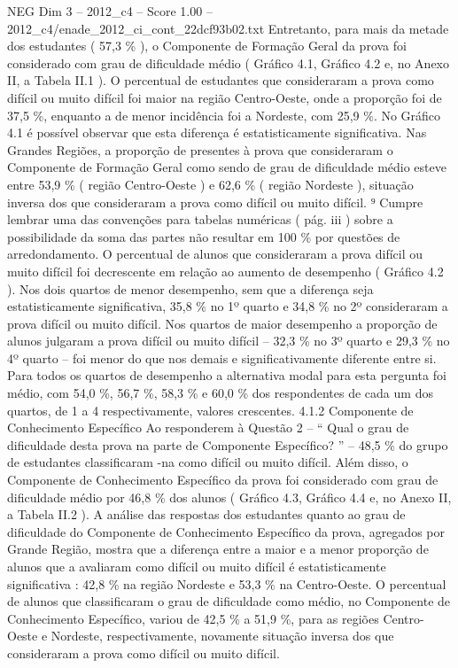 \begin{textsample}{NEG Dim 3 – 2012\_c4 – Score 1.00 – 2012\_c4/enade\_2012\_ci\_cont\_22dcf93b02.txt}
Entretanto, para mais da metade dos estudantes ( 57,3 \% ), o Componente de Formação Geral da prova foi considerado com grau de dificuldade médio ( Gráfico 4.1, Gráfico 4.2 e, no Anexo II, a Tabela II.1 ).
O percentual de estudantes que consideraram a prova como difícil ou muito difícil foi maior na região Centro-Oeste, onde a proporção foi de 37,5 \%, enquanto a de menor incidência foi a Nordeste, com 25,9 \%.
No Gráfico 4.1 é possível observar que esta diferença é estatisticamente significativa.
Nas Grandes Regiões, a proporção de presentes à prova que consideraram o Componente de Formação Geral como sendo de grau de dificuldade médio esteve entre 53,9 \% ( região Centro-Oeste ) e 62,6 \% ( região Nordeste ), situação inversa dos que consideraram a prova como difícil ou muito difícil. ⁹ Cumpre lembrar uma das convenções para tabelas numéricas ( pág. iii ) sobre a possibilidade da soma das partes não resultar em 100 \% por questões de arredondamento.
O percentual de alunos que consideraram a prova difícil ou muito difícil foi decrescente em relação ao aumento de desempenho ( Gráfico 4.2 ).
Nos dois quartos de menor desempenho, sem que a diferença seja estatisticamente significativa, 35,8 \% no 1º quarto e 34,8 \% no 2º consideraram a prova difícil ou muito difícil.
Nos quartos de maior desempenho a proporção de alunos julgaram a prova difícil ou muito difícil – 32,3 \% no 3º quarto e 29,3 \% no 4º quarto – foi menor do que nos demais e significativamente diferente entre si.
Para todos os quartos de desempenho a alternativa modal para esta pergunta foi médio, com 54,0 \%, 56,7 \%, 58,3 \% e 60,0 \% dos respondentes de cada um dos quartos, de 1 a 4 respectivamente, valores crescentes. 4.1.2 Componente de Conhecimento Específico Ao responderem à Questão 2 – “ Qual o grau de dificuldade desta prova na parte de Componente Específico? ” – 48,5 \% do grupo de estudantes classificaram -na como difícil ou muito difícil.
Além disso, o Componente de Conhecimento Específico da prova foi considerado com grau de dificuldade médio por 46,8 \% dos alunos ( Gráfico 4.3, Gráfico 4.4 e, no Anexo II, a Tabela II.2 ).
A análise das respostas dos estudantes quanto ao grau de dificuldade do Componente de Conhecimento Específico da prova, agregados por Grande Região, mostra que a diferença entre a maior e a menor proporção de alunos que a avaliaram como difícil ou muito difícil é estatisticamente significativa : 42,8 \% na região Nordeste e 53,3 \% na Centro-Oeste.
O percentual de alunos que classificaram o grau de dificuldade como médio, no Componente de Conhecimento Específico, variou de 42,5 \% a 51,9 \%, para as regiões Centro-Oeste e Nordeste, respectivamente, novamente situação inversa dos que consideraram a prova como difícil ou muito difícil.

\end{textsample}
